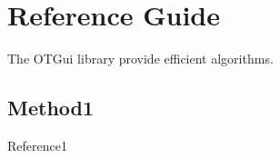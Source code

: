% 




\section{Reference Guide}

The OTGui library provide efficient algorithms.

\subsection{Method1}

{
}

{

\vspace{10mm}
Reference1
}